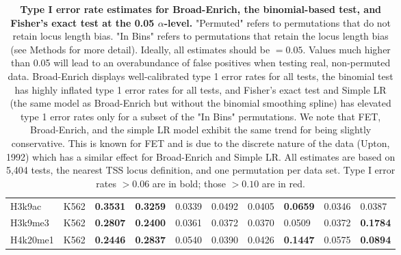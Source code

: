 \begin{table}[!ht]
\begin{tabular}{ll|ll|ll|ll|ll}
H3k9ac                               & K562                                   & {\color[HTML]{CB0000} \textbf{0.3531}}                       & {\color[HTML]{CB0000} \textbf{0.3259}}                      & 0.0339                                & 0.0492                               & 0.0405                                & \textbf{0.0659}                        & 0.0346                                & 0.0387                                 \\
H3k9me3                              & K562                                   & {\color[HTML]{CB0000} \textbf{0.2807}}                       & {\color[HTML]{CB0000} \textbf{0.2400}}                      & 0.0361                                & 0.0372                               & 0.0370                                & 0.0509                                 & 0.0372                                & {\color[HTML]{CB0000} \textbf{0.1784}} \\
H4k20me1                             & K562                                   & {\color[HTML]{CB0000} \textbf{0.2446}}                       & {\color[HTML]{CB0000} \textbf{0.2837}}                      & 0.0540                                & 0.0390                               & 0.0426                                & {\color[HTML]{CB0000} \textbf{0.1447}} & 0.0575                                & \textbf{0.0894}
\end{tabular}
\normalsize
\caption[Type I error rate estimates for Broad-Enrich, the binomial-based test, and Fisher's exact test at the 0.05 $\alpha$-level.]
{
\textbf{Type I error rate estimates for Broad-Enrich, the binomial-based test, and Fisher's exact test at the 0.05 $\alpha$-level.}
"Permuted" refers to permutations that do not retain locus length bias. "In Bins" refers to permutations that retain the locus length bias (see Methods for more detail). Ideally, all estimates should be $= 0.05$. Values much higher than 0.05 will lead to an overabundance of false positives when testing real, non-permuted data. Broad-Enrich displays well-calibrated type 1 error rates for all tests, the binomial test has highly inflated type 1 error rates for all tests, and Fisher's exact test and Simple LR (the same model as Broad-Enrich but without the binomial smoothing spline) has elevated type 1 error rates only for a subset of the "In Bins" permutations. We note that FET, Broad-Enrich, and the simple LR model exhibit the same trend for being slightly conservative. This is known for FET and is due to the discrete nature of the data (Upton, 1992) which has a similar effect for Broad-Enrich and Simple LR. All estimates are based on 5,404 tests, the nearest TSS locus definition, and one permutation per data set. Type I error rates $> 0.06$ are in bold; those $> 0.10$ are in red.
}
\label{chap2:table:1}

\end{table}

